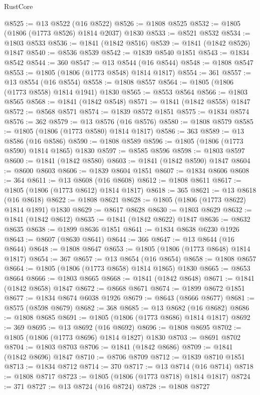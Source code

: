 \begin{lexlean}{RustCore}
\begin{coremodule}
@8525 := @13 @8522 (@16 @8522)
@8526 := @1808 @8525
@8532 := @1805 (@1806 (@1773 @8526) @1814 @2037) @1830
@8533 := @8521 @8532
@8534 := @1803 @8533
@8536 := @1841 (@1842 @8516)
@8539 := @1841 (@1842 @8526) @1847
@8540 := @8536 @8539
@8542 := @1839 @8540 @1851
@8543 := @1834 @8542
@8544 := 360
@8547 := @13 @8544 (@16 @8544)
@8548 := @1808 @8547
@8553 := @1805 (@1806 (@1773 @8548) @1814 @1817)
@8554 := 361
@8557 := @13 @8554 (@16 @8554)
@8558 := @1808 @8557
@8564 := @1805 (@1806 (@1773 @8558) @1814 @1941) @1830
@8565 := @8553 @8564
@8566 := @1803 @8565
@8568 := @1841 (@1842 @8548)
@8571 := @1841 (@1842 @8558) @1847
@8572 := @8568 @8571
@8574 := @1839 @8572 @1851
@8575 := @1834 @8574
@8576 := 362
@8579 := @13 @8576 (@16 @8576)
@8580 := @1808 @8579
@8585 := @1805 (@1806 (@1773 @8580) @1814 @1817)
@8586 := 363
@8589 := @13 @8586 (@16 @8586)
@8590 := @1808 @8589
@8596 := @1805 (@1806 (@1773 @8590) @1814 @1865) @1830
@8597 := @8585 @8596
@8598 := @1803 @8597
@8600 := @1841 (@1842 @8580)
@8603 := @1841 (@1842 @8590) @1847
@8604 := @8600 @8603
@8606 := @1839 @8604 @1851
@8607 := @1834 @8606
@8608 := 364
@8611 := @13 @8608 (@16 @8608)
@8612 := @1808 @8611
@8617 := @1805 (@1806 (@1773 @8612) @1814 @1817)
@8618 := 365
@8621 := @13 @8618 (@16 @8618)
@8622 := @1808 @8621
@8628 := @1805 (@1806 (@1773 @8622) @1814 @1891) @1830
@8629 := @8617 @8628
@8630 := @1803 @8629
@8632 := @1841 (@1842 @8612)
@8635 := @1841 (@1842 @8622) @1847
@8636 := @8632 @8635
@8638 := @1899 @8636 @1851
@8641 := @1834 @8638 @6230 @1926
@8643 := @8607 (@8630 @8641)
@8644 := 366
@8647 := @13 @8644 (@16 @8644)
@8648 := @1808 @8647
@8653 := @1805 (@1806 (@1773 @8648) @1814 @1817)
@8654 := 367
@8657 := @13 @8654 (@16 @8654)
@8658 := @1808 @8657
@8664 := @1805 (@1806 (@1773 @8658) @1814 @1865) @1830
@8665 := @8653 @8664
@8666 := @1803 @8665
@8668 := @1841 (@1842 @8648)
@8671 := @1841 (@1842 @8658) @1847
@8672 := @8668 @8671
@8674 := @1899 @8672 @1851
@8677 := @1834 @8674 @6038 @1926
@8679 := @8643 (@8666 @8677)
@8681 := @8575 (@8598 @8679)
@8682 := 368
@8685 := @13 @8682 (@16 @8682)
@8686 := @1808 @8685
@8691 := @1805 (@1806 (@1773 @8686) @1814 @1817)
@8692 := 369
@8695 := @13 @8692 (@16 @8692)
@8696 := @1808 @8695
@8702 := @1805 (@1806 (@1773 @8696) @1814 @1827) @1830
@8703 := @8691 @8702
@8704 := @1803 @8703
@8706 := @1841 (@1842 @8686)
@8709 := @1841 (@1842 @8696) @1847
@8710 := @8706 @8709
@8712 := @1839 @8710 @1851
@8713 := @1834 @8712
@8714 := 370
@8717 := @13 @8714 (@16 @8714)
@8718 := @1808 @8717
@8723 := @1805 (@1806 (@1773 @8718) @1814 @1817)
@8724 := 371
@8727 := @13 @8724 (@16 @8724)
@8728 := @1808 @8727

\end{coremodule}
\end{lexlean}
